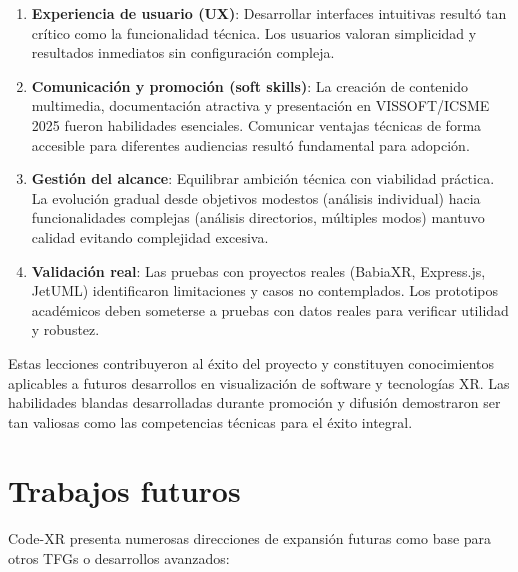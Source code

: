 \documentclass[a4paper, 12pt]{book}
\begin{document}
\begin{enumerate}
  \item \textbf{Experiencia de usuario (UX)}: Desarrollar interfaces intuitivas resultó tan crítico como la funcionalidad técnica. Los usuarios valoran simplicidad y resultados inmediatos sin configuración compleja.
  
  \item \textbf{Comunicación y promoción (soft skills)}: La creación de contenido multimedia, documentación atractiva y presentación en VISSOFT/ICSME 2025 fueron habilidades esenciales. Comunicar ventajas técnicas de forma accesible para diferentes audiencias resultó fundamental para adopción.
  
  \item \textbf{Gestión del alcance}: Equilibrar ambición técnica con viabilidad práctica. La evolución gradual desde objetivos modestos (análisis individual) hacia funcionalidades complejas (análisis directorios, múltiples modos) mantuvo calidad evitando complejidad excesiva.
  
  \item \textbf{Validación real}: Las pruebas con proyectos reales (BabiaXR, Express.js, JetUML) identificaron limitaciones y casos no contemplados. Los prototipos académicos deben someterse a pruebas con datos reales para verificar utilidad y robustez.
\end{enumerate}

Estas lecciones contribuyeron al éxito del proyecto y constituyen conocimientos aplicables a futuros desarrollos en visualización de software y tecnologías XR. Las habilidades blandas desarrolladas durante promoción y difusión demostraron ser tan valiosas como las competencias técnicas para el éxito integral.


\section{Trabajos futuros}
\label{sec:trabajos_futuros}

Code-XR presenta numerosas direcciones de expansión futuras como base para otros TFGs o desarrollos avanzados:
\end{document}
